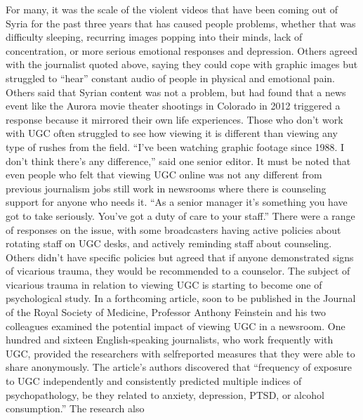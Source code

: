 \documentclass[symmetric, notoc, nobib]{towcenter-book}
\begin{document}
For many, it was the scale of the violent videos that have been coming out
of Syria for the past three years that has caused people problems, whether
that was difficulty sleeping, recurring images popping into their minds,
lack of concentration, or more serious emotional responses and depression.
Others agreed with the journalist quoted above, saying they could
cope with graphic images but struggled to ``hear'' constant audio of people
in physical and emotional pain. Others said that Syrian content was not a
problem, but had found that a news event like the Aurora movie theater
shootings in Colorado in 2012 triggered a response because it mirrored
their own life experiences.
Those who don't work with UGC often struggled to see how viewing it is
different than viewing any type of rushes from the field. ``I've been watching
graphic footage since 1988. I don't think there's any difference,'' said one
senior editor. It must be noted that even people who felt that viewing UGC
online was not any different from previous journalism jobs still work in
newsrooms where there is counseling support for anyone who needs it. ``As
a senior manager it's something you have got to take seriously. You've got a
duty of care to your staff.'' There were a range of responses on the issue, with
some broadcasters having active policies about rotating staff on UGC desks,
and actively reminding staff about counseling. Others didn't have specific
policies but agreed that if anyone demonstrated signs of vicarious trauma,
they would be recommended to a counselor.
The subject of vicarious trauma in relation to viewing UGC is starting to
become one of psychological study. In a forthcoming article, soon to be
published in the Journal of the Royal Society of Medicine, Professor Anthony
Feinstein and his two colleagues examined the potential impact of viewing
UGC in a newsroom. One hundred and sixteen English-speaking journalists,
who work frequently with UGC, provided the researchers with selfreported
measures that they were able to share anonymously. The article's
authors discovered that ``frequency of exposure to UGC independently and
consistently predicted multiple indices of psychopathology, be they related
to anxiety, depression, PTSD, or alcohol consumption.'' The research also
\end{document}
